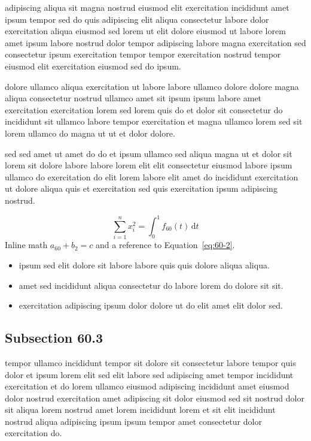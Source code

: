 \documentclass{article}
\begin{document}
adipiscing aliqua sit magna nostrud eiusmod elit exercitation incididunt amet ipsum tempor sed do quis adipiscing elit aliqua consectetur labore dolor exercitation aliqua eiusmod sed lorem ut elit dolore eiusmod ut labore lorem amet ipsum labore nostrud dolor tempor adipiscing labore magna exercitation sed consectetur ipsum exercitation tempor tempor exercitation nostrud tempor eiusmod elit exercitation eiusmod sed do ipsum.

dolore ullamco aliqua exercitation ut labore labore ullamco dolore dolore magna aliqua consectetur nostrud ullamco amet sit ipsum ipsum labore amet exercitation exercitation lorem sed lorem quis do et dolor sit consectetur do incididunt sit ullamco labore tempor exercitation et magna ullamco lorem sed sit lorem ullamco do magna ut ut et dolor dolore.

sed sed amet ut amet do do et ipsum ullamco sed aliqua magna ut et dolor sit lorem sit dolore labore labore lorem elit elit consectetur eiusmod labore ipsum ullamco do exercitation do elit lorem labore elit amet do incididunt exercitation ut dolore aliqua quis et exercitation sed quis exercitation ipsum adipiscing nostrud.

\begin{equation}\label{eq:60-2}
  \sum_{i=1}^{n} x_i^{2} = \int_0^1 f_{60}(t)\,\mathrm{d}t
\end{equation}
Inline math $a_{60} + b_{2} = c$ and a reference to Equation~\eqref{eq:60-2}.

\begin{itemize}
  \item ipsum sed elit dolore sit labore labore quis quis dolore aliqua aliqua.
  \item amet sed incididunt aliqua consectetur do labore lorem do dolore sit sit.
  \item exercitation adipiscing ipsum dolor dolore ut do elit amet elit dolor sed.
\end{itemize}

\subsection{Subsection 60.3}\label{sec:60-3}
tempor ullamco incididunt tempor sit dolore sit consectetur labore tempor quis dolor et ipsum lorem elit sed elit labore sed adipiscing amet tempor incididunt exercitation et do lorem ullamco eiusmod adipiscing incididunt amet eiusmod dolor nostrud exercitation amet adipiscing sit dolor eiusmod sed sit nostrud dolor sit aliqua lorem nostrud amet lorem incididunt lorem et sit elit incididunt nostrud aliqua adipiscing ipsum ipsum tempor amet consectetur dolor exercitation do.
\end{document}
